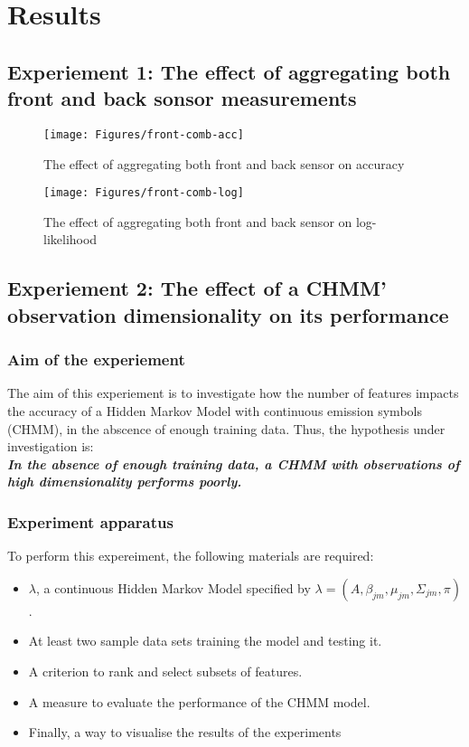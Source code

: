 \chapter{Results}

\section{Experiement 1: The effect of aggregating both front and back sonsor measurements}

\begin{figure}[ht!]
	\texttt{[image: Figures/front-comb-acc]}
	\caption{The effect of aggregating both front and back sensor on accuracy}
	\label{fig:comb-acc}
\end{figure}

\begin{figure}[ht!]
	\texttt{[image: Figures/front-comb-log]}
	\caption{The effect of aggregating both front and back sensor on log-likelihood}
	\label{fig:comb-log}
\end{figure}

\section{Experiement 2: The effect of a CHMM' observation dimensionality on its performance}

\subsection{Aim of the experiement}
The aim of this experiement is to investigate how the number of features impacts the accuracy of a Hidden Markov Model with continuous emission symbols (CHMM), in the abscence of enough training data. Thus, the hypothesis under investigation is:\\
\textbf{\textit{In the absence of enough training data, a CHMM with observations of high dimensionality performs poorly.}}

\subsection{Experiment apparatus}
To perform this expereiment, the following materials are required:
\begin{itemize}
	\item \(\lambda\), a continuous Hidden Markov Model specified by \(\lambda = (A, \beta_{jm}, \mu_{jm}, \Sigma_{jm}, \pi)\).
	\item At least two sample data sets training the model and testing it.
	\item A criterion to rank and select subsets of features.
	\item A measure to evaluate the performance of the CHMM model.
	\item Finally, a way to visualise the results of the experiments
\end{itemize}

